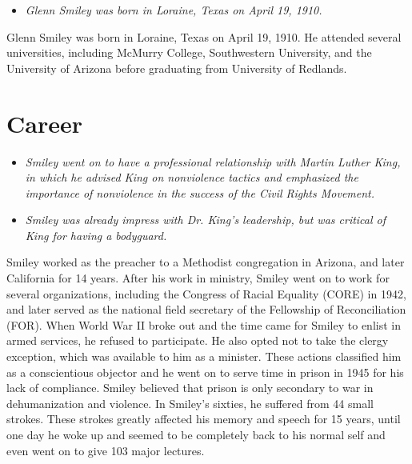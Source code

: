 \begin{itemize}
\item
  \emph{Glenn Smiley was born in Loraine, Texas on April 19, 1910.}
\end{itemize}

Glenn Smiley was born in Loraine, Texas on April 19, 1910. He attended
several universities, including McMurry College, Southwestern
University, and the University of Arizona before graduating from
University of Redlands.

\section{Career}\label{career}

\begin{itemize}
\item
  \emph{Smiley went on to have a professional relationship with Martin
  Luther King, in which he advised King on nonviolence tactics and
  emphasized the importance of nonviolence in the success of the Civil
  Rights Movement.}
\item
  \emph{Smiley was already impress with Dr. King's leadership, but was
  critical of King for having a bodyguard.}
\end{itemize}

Smiley worked as the preacher to a Methodist congregation in Arizona,
and later California for 14 years. After his work in ministry, Smiley
went on to work for several organizations, including the Congress of
Racial Equality (CORE) in 1942, and later served as the national field
secretary of the Fellowship of Reconciliation (FOR). When World War II
broke out and the time came for Smiley to enlist in armed services, he
refused to participate. He also opted not to take the clergy exception,
which was available to him as a minister. These actions classified him
as a conscientious objector and he went on to serve time in prison in
1945 for his lack of compliance. Smiley believed that prison is only
secondary to war in dehumanization and violence. In Smiley's sixties, he
suffered from 44 small strokes. These strokes greatly affected his
memory and speech for 15 years, until one day he woke up and seemed to
be completely back to his normal self and even went on to give 103 major
lectures.

